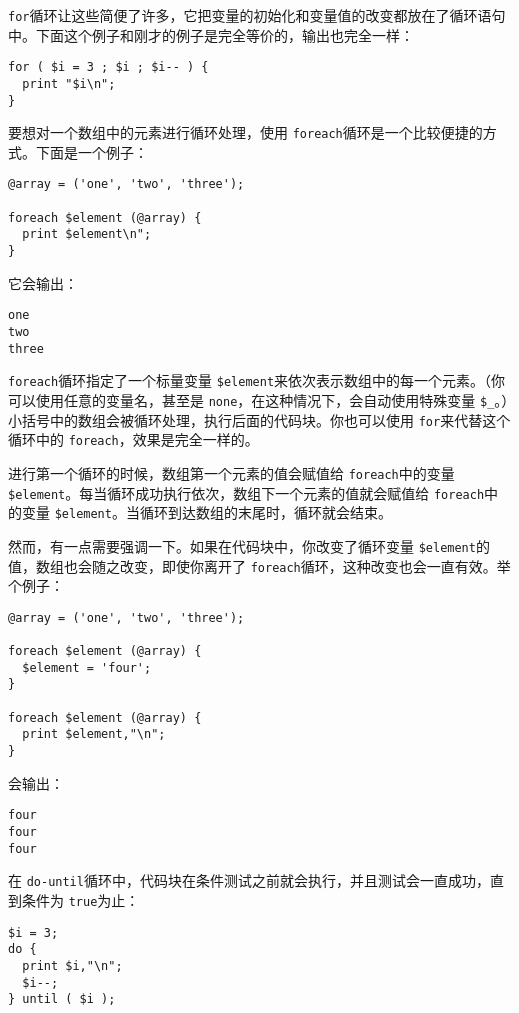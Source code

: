  \verb|for|循环让这些简便了许多，它把变量的初始化和变量值的改变都放在了循环语句中。下面这个例子和刚才的例子是完全等价的，输出也完全一样：

\begin{lstlisting}
for ( $i = 3 ; $i ; $i-- ) {
  print "$i\n";
}
\end{lstlisting}

要想对一个数组中的元素进行循环处理，使用 \verb|foreach|循环是一个比较便捷的方式。下面是一个例子：

\begin{lstlisting}
@array = ('one', 'two', 'three');

foreach $element (@array) {
  print $element\n";
}
\end{lstlisting}

它会输出：

\begin{lstlisting}
one
two
three
\end{lstlisting}

 \verb|foreach|循环指定了一个标量变量 \verb|$element|来依次表示数组中的每一个元素。（你可以使用任意的变量名，甚至是 \verb|none|，在这种情况下，会自动使用特殊变量 \verb|$_|。）小括号中的数组会被循环处理，执行后面的代码块。你也可以使用 \verb|for|来代替这个循环中的 \verb|foreach|，效果是完全一样的。

进行第一个循环的时候，数组第一个元素的值会赋值给 \verb|foreach|中的变量 \verb|$element|。每当循环成功执行依次，数组下一个元素的值就会赋值给 \verb|foreach|中的变量 \verb|$element|。当循环到达数组的末尾时，循环就会结束。

然而，有一点需要强调一下。如果在代码块中，你改变了循环变量 \verb|$element|的值，数组也会随之改变，即使你离开了 \verb|foreach|循环，这种改变也会一直有效。举个例子：

\begin{lstlisting}
@array = ('one', 'two', 'three');

foreach $element (@array) {
  $element = 'four';
}

foreach $element (@array) {
  print $element,"\n";
}
\end{lstlisting}

会输出：

\begin{lstlisting}
four
four
four
\end{lstlisting}

在 \verb|do-until|循环中，代码块在条件测试之前就会执行，并且测试会一直成功，直到条件为 \verb|true|为止：

\begin{lstlisting}
$i = 3;
do {
  print $i,"\n";
  $i--;
} until ( $i );
\end{lstlisting}

